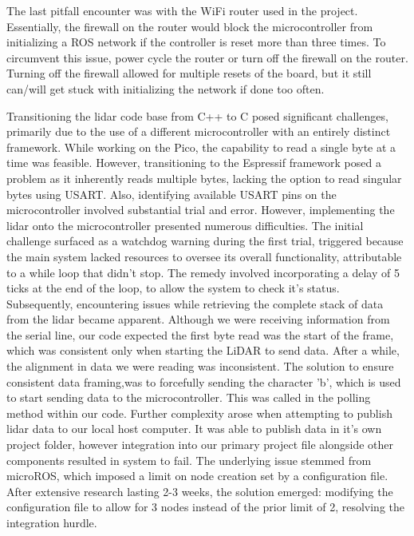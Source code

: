 \documentclass[conference]{IEEEtran}
\begin{document}
 The last pitfall encounter was with the WiFi router used in the project. Essentially, the firewall on the router would block the microcontroller from initializing a ROS network if the controller is reset more than three times. To circumvent this issue, power cycle the router or turn off the firewall on the router. Turning off the firewall allowed for multiple resets of the board, but it still can/will get stuck with initializing the network if done too often.
 
Transitioning the lidar code base from C++ to C posed significant challenges, primarily due to the use of a different microcontroller with an entirely distinct framework. While working on the Pico, the capability to read a single byte at a time was feasible. However, transitioning to the Espressif framework posed a problem as it inherently reads multiple bytes, lacking the option to read singular bytes using USART. Also, identifying available USART pins on the microcontroller involved substantial trial and error.
However, implementing the lidar onto the microcontroller presented numerous difficulties. The initial challenge surfaced as a watchdog warning during the first trial, triggered because the main system lacked resources to oversee its overall functionality, attributable to a while loop that didn't stop. The remedy involved incorporating a delay of 5 ticks at the end of the loop, to allow the system to check it’s status.
Subsequently, encountering issues while retrieving the complete stack of data from the lidar became apparent. Although we were receiving information from the serial line, our code expected the first byte read was the start of the frame, which was consistent only when starting the LiDAR to send data. After a while, the alignment in data we were reading was inconsistent. The solution to ensure consistent data framing,was to forcefully sending the character 'b', which is used to start sending data to the microcontroller. This was called in the polling method within our code.
Further complexity arose when attempting to publish lidar data to our local host computer. It was able to publish data in it’s own project folder, however integration into our primary project file alongside other components resulted in system to fail. The underlying issue stemmed from microROS, which imposed a limit on node creation set by a configuration file. After extensive research lasting 2-3 weeks, the solution emerged: modifying the configuration file to allow for 3 nodes instead of the prior limit of 2, resolving the integration hurdle.


\nocite{*}

\vspace{12pt}
\end{document}
